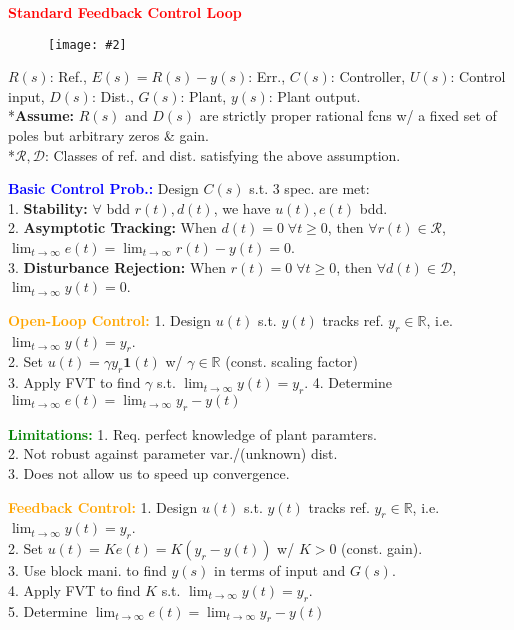 \documentclass[5pt]{extarticle} %
\newcommand{\customFigure}[3][]{%
    \vspace{-1.5em}
    \begin{figure}[H]
        \centering
        \texttt{[image: \#2]}
    \end{figure}
    \vspace{-1.5em}
}
\begin{document}
\begin{paracol}{3}
    {\tiny
    
    \textcolor{red}{\textbf{Standard Feedback Control Loop}}
    \customFigure[0.2]{../Images/L16_0.png}
    *$R(s)$: Ref., $E(s) = R(s) - y(s)$: Err., $C(s)$: Controller, $U(s)$: Control input, $D(s)$: Dist., $G(s)$: Plant, $y(s)$: Plant output. \\
    *\textbf{Assume:} $R(s)$ and $D(s)$ are strictly proper rational fcns w/ a fixed set of poles but arbitrary zeros \& gain. \\
    *$\mathcal{R}, \mathcal{D}$: Classes of ref. and dist. satisfying the above assumption.

    \textcolor{blue}{\textbf{Basic Control Prob.:}} Design $C(s)$ s.t. 3 spec. are met: \\
    1. \textbf{Stability:} $\forall$ bdd $r(t),d(t)$, we have $u(t),e(t)$ bdd. \\
    2. \textbf{Asymptotic Tracking:} When $d(t) = 0 \; \forall t \geq 0$, then $\forall r(t) \in \mathcal{R}$, $\lim_{t \to \infty} e(t) = \lim_{t \rightarrow \infty} r(t) - y(t) = 0$. \\
    3. \textbf{Disturbance Rejection:} When $r(t) = 0 \; \forall t \geq 0$, then $\forall d(t) \in \mathcal{D}$, $\lim_{t \to \infty} y(t) = 0$.

    \textcolor{orange}{\textbf{Open-Loop Control:}} 1. Design $u(t)$ s.t. $y(t)$ tracks ref. $y_r \in \mathbb{R}$, i.e. $\lim_{t \rightarrow \infty} y(t) = y_r$. \\
    2. Set $u(t) = \gamma y_r \mathbf{1}(t)$ w/ $\gamma \in \mathbb{R}$ (const. scaling factor) \\
    3. Apply FVT to find $\gamma$ s.t. $\lim_{t \to \infty} y(t) = y_r$.
    4. Determine $\lim_{t \rightarrow \infty} e(t) = \lim_{t \rightarrow \infty} y_r - y(t)$

    \textcolor{green}{\textbf{Limitations:}} 1. Req. perfect knowledge of plant paramters. \\
    2. Not robust against parameter var./(unknown) dist. \\
    3. Does not allow us to speed up convergence. 

    \textcolor{orange}{\textbf{Feedback Control:}} 1. Design $u(t)$ s.t. $y(t)$ tracks ref. $y_r \in \mathbb{R}$, i.e. $\lim_{t \rightarrow \infty} y(t) = y_r$. \\
    2. Set $u(t) = K e(t) = K (y_r - y(t))$ w/ $K>0$ (const. gain). \\ 
    3. Use block mani. to find $y(s)$ in terms of input and $G(s)$. \\
    4. Apply FVT to find $K$ s.t. $\lim_{t \to \infty} y(t) = y_r$. \\
    5. Determine $\lim_{t \rightarrow \infty} e(t) = \lim_{t \rightarrow \infty} y_r - y(t)$

}
\end{paracol}
\end{document}
